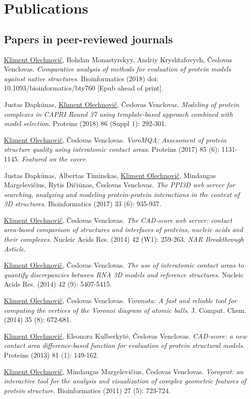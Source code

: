 \documentclass{article}
\newenvironment{enumerate_tight}{
\begin{enumerate}
  \setlength{\itemsep}{2pt}
  \setlength{\parskip}{0pt}
  \setlength{\parsep}{0pt}
}{\end{enumerate}}
\begin{document}
\section*{Publications}

\subsection*{Papers in peer-reviewed journals}
\begin{enumerate_tight}
  \item \underline{Kliment Olechnovič}, Bohdan Monastyrskyy, Andriy Kryshtafovych, Česlovas Venclovas.
        \emph{Comparative analysis of methods for evaluation of protein models against native structures}.
        Bioinformatics (2018) doi: 10.1093/bioinformatics/bty760 [Epub ahead of print].
  \item Justas Dapkūnas, \underline{Kliment Olechnovič}, Česlovas Venclovas.
        \emph{Modeling of protein complexes in CAPRI Round 37 using template-based approach combined with model selection}.
        Proteins (2018) 86 (Suppl 1): 292-301.
  \item \underline{Kliment Olechnovič}, Česlovas Venclovas.
        \emph{VoroMQA: Assessment of protein structure quality using interatomic contact areas}.
        Proteins (2017) 85 (6): 1131-1145. \emph{Featured on the cover}.
  \item Justas Dapkūnas, Albertas Timinskas, \underline{Kliment Olechnovič}, Mindaugas Margelevičius, Rytis Dičiūnas, Česlovas Venclovas.
        \emph{The PPI3D web server for searching, analyzing and modeling protein-protein interactions in the context of 3D structures}.
        Bioinformatics (2017) 33 (6): 935-937.
  \item \underline{Kliment Olechnovič}, Česlovas Venclovas.
        \emph{The CAD-score web server: contact area-based comparison of structures and interfaces of proteins, nucleic acids and their complexes}.
        Nucleic Acids Res. (2014) 42 (W1): 259-263. \emph{NAR Breakthrough Article}.
  \item \underline{Kliment Olechnovič}, Česlovas Venclovas.
        \emph{The use of interatomic contact areas to quantify discrepancies between RNA 3D models and reference structures}.
        Nucleic Acids Res. (2014) 42 (9): 5407-5415.
  \item \underline{Kliment Olechnovič}, Česlovas Venclovas.
        \emph{Voronota: A fast and reliable tool for computing the vertices of the Voronoi diagram of atomic balls}.
        J. Comput. Chem. (2014) 35 (8): 672-681.
  \item \underline{Kliment Olechnovič}, Eleonora Kulberkytė, Česlovas Venclovas.
        \emph{CAD-score: a new contact area difference-based function for evaluation of protein structural models}.
        Proteins (2013) 81 (1): 149-162.
  \item \underline{Kliment Olechnovič}, Mindaugas Margelevičius, Česlovas Venclovas.
        \emph{Voroprot: an interactive tool for the analysis and visualization of complex geometric features of protein structure}.
        Bioinformatics (2011) 27 (5): 723-724.
\end{enumerate_tight}
\end{document}
